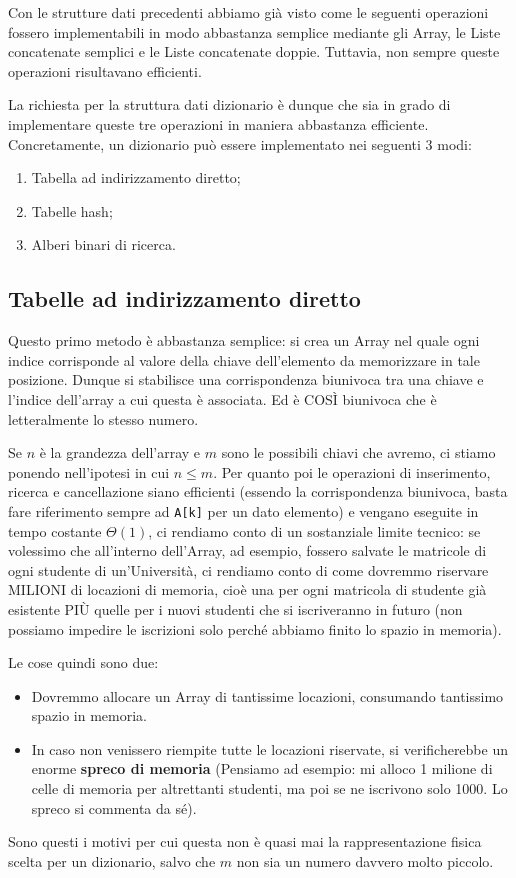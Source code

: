 \documentclass[12pt]{report}
\begin{document}
	Con le strutture dati precedenti abbiamo già visto come le seguenti operazioni fossero implementabili in modo abbastanza semplice mediante gli Array, le Liste concatenate semplici e le Liste concatenate doppie. Tuttavia, non sempre queste operazioni risultavano efficienti.
	
	La richiesta per la struttura dati dizionario è dunque che sia in grado di implementare queste tre operazioni in maniera abbastanza efficiente. Concretamente, un dizionario può essere implementato nei seguenti 3 modi:
	\begin{enumerate}
		\item Tabella ad indirizzamento diretto;
		\item Tabelle hash;
		\item Alberi binari di ricerca.
	\end{enumerate}
	
	\subsection{Tabelle ad indirizzamento diretto}
	Questo primo metodo è abbastanza semplice: si crea un Array nel quale ogni indice corrisponde al valore della chiave dell'elemento da memorizzare in tale posizione. Dunque si stabilisce una corrispondenza biunivoca tra una chiave e l'indice dell'array a cui questa è associata. Ed è COSÌ biunivoca che è letteralmente lo stesso numero.
	
	Se $n$ è la grandezza dell'array e $m$ sono le possibili chiavi che avremo, ci stiamo ponendo nell'ipotesi in cui $n \leq m$. Per quanto poi le operazioni di inserimento, ricerca e cancellazione siano efficienti (essendo la corrispondenza biunivoca, basta fare riferimento sempre ad \texttt{A[k]} per un dato elemento) e vengano eseguite in tempo costante $\Theta(1)$, ci rendiamo conto di un sostanziale limite tecnico: se volessimo che all'interno dell'Array, ad esempio, fossero salvate le matricole di ogni studente di un'Università, ci rendiamo conto di come dovremmo riservare MILIONI di locazioni di memoria, cioè una per ogni matricola di studente già esistente PIÙ quelle per i nuovi studenti che si iscriveranno in futuro (non possiamo impedire le iscrizioni solo perché abbiamo finito lo spazio in memoria).
	
	Le cose quindi sono due:
	\begin{itemize}
		\item Dovremmo allocare un Array di tantissime locazioni, consumando tantissimo spazio in memoria.
		\item In caso non venissero riempite tutte le locazioni riservate, si verificherebbe un enorme \textbf{spreco di memoria} (Pensiamo ad esempio: mi alloco 1 milione di celle di memoria per altrettanti studenti, ma poi se ne iscrivono solo 1000. Lo spreco si commenta da sé).
	\end{itemize}
	Sono questi i motivi per cui questa non è quasi mai la rappresentazione fisica scelta per un dizionario, salvo che $m$ non sia un numero davvero molto piccolo.
	
\end{document}
